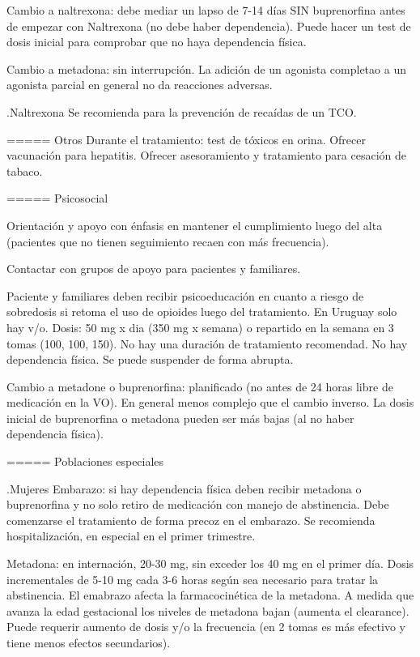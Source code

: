 \documentclass{scrbook}
\begin{document}
Cambio a naltrexona: debe mediar un lapso de 7-14 días SIN buprenorfina antes de empezar con Naltrexona (no debe haber dependencia). Puede hacer un test de dosis inicial para comprobar que no haya dependencia física.

Cambio a metadona: sin interrupción. La adición de un agonista completao a un agonista parcial en general no da reacciones adversas.

.Naltrexona
Se recomienda para la prevención de recaídas de un TCO.

===== Otros
Durante el tratamiento: test de tóxicos en orina.
Ofrecer vacunación para hepatitis.
Ofrecer asesoramiento y tratamiento para cesación de tabaco.

===== Psicosocial

Orientación y apoyo con énfasis en mantener el cumplimiento luego del alta (pacientes que no tienen seguimiento recaen con más frecuencia).

Contactar con grupos de apoyo para pacientes y familiares.

Paciente y familiares deben recibir psicoeducación en cuanto a riesgo de sobredosis si retoma el uso de opioides luego del tratamiento. En Uruguay solo hay v/o.
Dosis: 50 mg x dia (350 mg x semana) o repartido en la semana en 3 tomas (100, 100, 150).
No hay una duración de tratamiento recomendad. No hay dependencia física. Se puede suspender de forma abrupta.

Cambio a metadone o buprenorfina: planificado (no antes de 24 horas libre de medicación en la VO). En general menos complejo que el cambio inverso. La dosis inicial de buprenorfina o metadona pueden ser más bajas (al no haber dependencia física).

===== Poblaciones especiales

.Mujeres
Embarazo: si hay dependencia física deben recibir metadona o buprenorfina y no solo retiro de medicación con manejo de abstinencia. Debe comenzarse el tratamiento de forma precoz en el embarazo. Se recomienda hospitalización, en especial en el primer trimestre.

Metadona: en internación, 20-30 mg, sin exceder los 40 mg en el primer día. Dosis incrementales de 5-10 mg cada 3-6 horas según sea necesario para tratar la abstinencia. El emabrazo afecta la farmacocinética de la metadona. A medida que avanza la edad gestacional los niveles de metadona bajan (aumenta el clearance). Puede requerir aumento de dosis y/o la frecuencia (en 2 tomas es más efectivo y tiene menos efectos secundarios).
\end{document}
